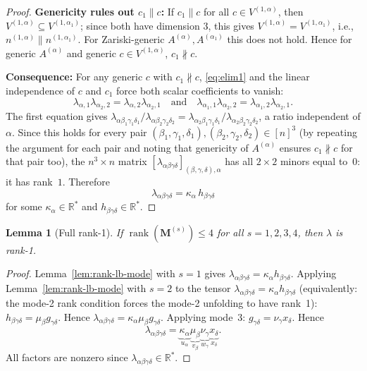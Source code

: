 \documentclass[12pt]{article}
\newtheorem{lemma}[theorem]{Lemma}
\theoremstyle{definition}
\DeclareMathOperator{\rank}{rank}
\newcommand{\bR}{\mathbb{R}}
\begin{document}
\begin{proof}
\noindent\textbf{Genericity rules out $c_1\parallel c$:}
If $c_1\parallel c$ for all $c\in V^{(1,\alpha)}$, then $V^{(1,\alpha)}\subseteq V^{(1,\alpha_1)}$;
since both have dimension $3$, this gives $V^{(1,\alpha)}=V^{(1,\alpha_1)}$, i.e.,
$n^{(1,\alpha)}\parallel n^{(1,\alpha_1)}$.  For Zariski-generic $A^{(\alpha)},A^{(\alpha_1)}$
this does not hold.  Hence for generic $A^{(\alpha)}$ and generic $c\in V^{(1,\alpha)}$,
$c_1\not\parallel c$.

\noindent\textbf{Consequence:} For any generic $c$ with $c_1\not\parallel c$, \eqref{eq:elim1}
and the linear independence of $c$ and $c_1$ force both scalar coefficients to vanish:
\begin{equation}\label{eq:2x2zero}
  \lambda_{\alpha,1}\lambda_{\alpha_2,2} = \lambda_{\alpha,2}\lambda_{\alpha_2,1}
  \quad\text{and}\quad
  \lambda_{\alpha_1,1}\lambda_{\alpha_2,2} = \lambda_{\alpha_1,2}\lambda_{\alpha_2,1}.
\end{equation}
The first equation gives
$\lambda_{\alpha\beta_1\gamma_1\delta_1}/\lambda_{\alpha\beta_2\gamma_2\delta_2}
=\lambda_{\alpha_2\beta_1\gamma_1\delta_1}/\lambda_{\alpha_2\beta_2\gamma_2\delta_2}$,
a ratio independent of $\alpha$.  Since this holds for every pair
$(\beta_1,\gamma_1,\delta_1),(\beta_2,\gamma_2,\delta_2)\in[n]^3$ (by repeating the
argument for each pair and noting that genericity of $A^{(\alpha)}$ ensures
$c_1\not\parallel c$ for that pair too), the $n^3\times n$ matrix
$[\lambda_{\alpha\beta\gamma\delta}]_{(\beta,\gamma,\delta),\alpha}$ has all $2\times2$ minors
equal to~$0$: it has rank~$1$.  Therefore
\begin{equation}\label{eq:mode1-rank1}
  \lambda_{\alpha\beta\gamma\delta} = \kappa_\alpha\,h_{\beta\gamma\delta}
\end{equation}
for some $\kappa_\alpha\in\bR^*$ and $h_{\beta\gamma\delta}\in\bR^*$.
\end{proof}

\begin{lemma}[Full rank-1]\label{lem:full-rank1}
If $\rank(\mathbf{M}^{(s)})\leq 4$ for all $s=1,2,3,4$, then $\lambda$ is rank-1.
\end{lemma}

\begin{proof}
Lemma~\ref{lem:rank-lb-mode} with $s=1$ gives $\lambda_{\alpha\beta\gamma\delta}=\kappa_\alpha h_{\beta\gamma\delta}$.
Applying Lemma~\ref{lem:rank-lb-mode} with $s=2$ to the tensor
$\lambda_{\alpha\beta\gamma\delta}=\kappa_\alpha h_{\beta\gamma\delta}$
(equivalently: the mode-2 rank condition forces the mode-2 unfolding to have rank~1):
$h_{\beta\gamma\delta}=\mu_\beta g_{\gamma\delta}$.
Hence $\lambda_{\alpha\beta\gamma\delta}=\kappa_\alpha\mu_\beta g_{\gamma\delta}$.
Applying mode~3: $g_{\gamma\delta}=\nu_\gamma x_\delta$.
Hence
\begin{equation}\label{eq:final-rank1}
  \lambda_{\alpha\beta\gamma\delta}
  = \underbrace{\kappa_\alpha}_{u_\alpha}
    \underbrace{\mu_\beta}_{v_\beta}
    \underbrace{\nu_\gamma}_{w_\gamma}
    \underbrace{x_\delta}_{x_\delta}.
\end{equation}
All factors are nonzero since $\lambda_{\alpha\beta\gamma\delta}\in\bR^*$.
\end{proof}
\end{document}

